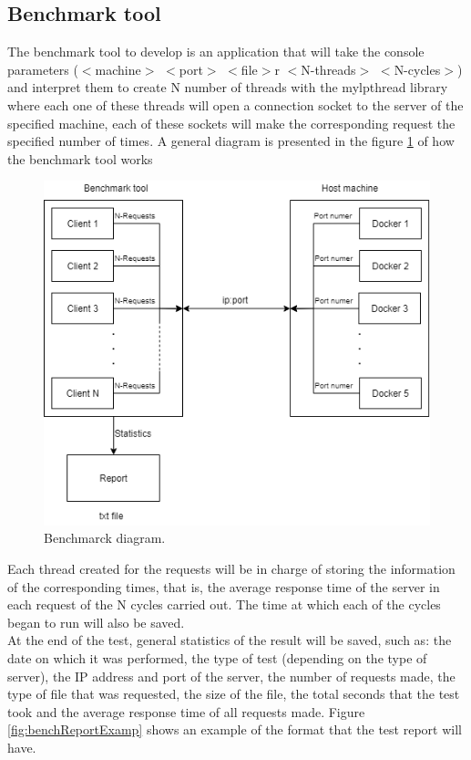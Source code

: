 \documentclass{article}
\begin{document}
\subsection{Benchmark tool}
The benchmark tool to develop is an application that will take the console parameters ($<$machine$>$ $<$port$>$ $<$file$>$r $<$N-threads$>$ $<$N-cycles$>$) and interpret them to create N number of threads with the mylpthread library where each one of these threads will open a connection socket to the server of the specified machine, each of these sockets will make the corresponding request the specified number of times. A general diagram is presented in the figure \ref{fig:BenchMarkDiagram} of how the benchmark tool works\\
\begin{figure}[H]
	\centering
	\captionsetup{justification=centering, margin=1cm}
    \includegraphics[width=\columnwidth]{BenchMarkDiagram.png}
    \caption{Benchmarck diagram.}
	\label{fig:BenchMarkDiagram}
\end{figure}
Each thread created for the requests will be in charge of storing the information of the corresponding times, that is, the average response time of the server in each request of the N cycles carried out. The time at which each of the cycles began to run will also be saved.\\
At the end of the test, general statistics of the result will be saved, such as: the date on which it was performed, the type of test (depending on the type of server), the IP address and port of the server, the number of requests made, the type of file that was requested, the size of the file, the total seconds that the test took and the average response time of all requests made. Figure \ref{fig:benchReportExamp} shows an example of the format that the test report will have.
\end{document}
